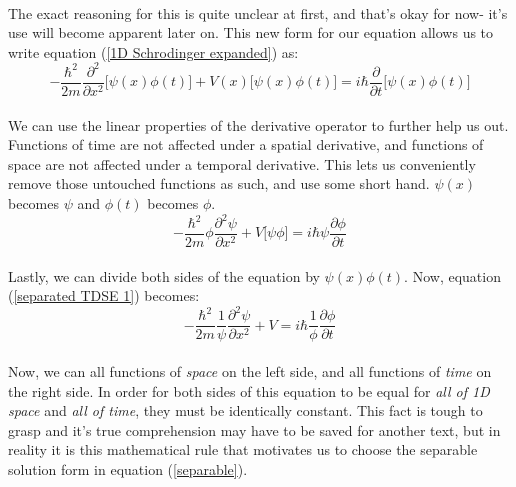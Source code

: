 \documentclass[12pt,letterpaper]{book}
\begin{document}
\paragraph*{}The exact reasoning for this is quite unclear at first, and that's okay for now- it's use will become apparent later on. This new form for our equation allows us to write equation (\ref{1D Schrodinger expanded}) as:
\begin{equation}
\label{separated TDSE 0}
-\frac{\hbar^2}{2m}\frac{\partial^2}{\partial x^2}\Big[ \psi(x)\phi(t) \Big] +
V(x)\Big[ \psi(x)\phi(t) \Big] = i\hbar\frac{\partial}{\partial t}\Big[ \psi(x)\phi(t) \Big]
\end{equation}
\paragraph*{}We can use the linear properties of the derivative operator to further help us out. Functions of time are not affected under a spatial derivative, and functions of space are not affected under a temporal derivative. This lets us conveniently remove those untouched functions as such, and use some short hand. $\psi(x)$ becomes $\psi$ and $\phi(t)$ becomes $\phi$.
\begin{equation}
\label{separated TDSE 1}
-\frac{\hbar^2}{2m}\phi\frac{\partial^2\psi}{\partial x^2} +
V\big[ \psi\phi \big] = 
i\hbar\psi\frac{\partial \phi}{\partial t}
\end{equation}
\paragraph*{}Lastly, we can divide both sides of the equation by $\psi(x)\phi(t)$. Now, equation (\ref{separated TDSE 1}) becomes:
\begin{equation}
\label{separated TDSE 2}
-\frac{\hbar^2}{2m}\frac{1}{\psi}\frac{\partial^2\psi}{\partial x^2} + V = 
i\hbar \frac{1}{\phi}\frac{\partial \phi}{\partial t}
\end{equation}
\paragraph*{}Now, we can all functions of \textit{space} on the left side, and all functions of \textit{time} on the right side. In order for both sides of this equation to be equal for \textit{all of 1D space} and \textit{all of time}, they must be identically constant. This fact is tough to grasp and it's true comprehension may have to be saved for another text, but in reality it is this mathematical rule that motivates us to choose the separable solution form in equation (\ref{separable}).
\end{document}
